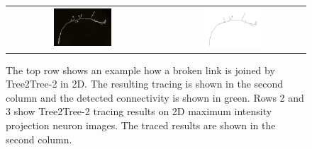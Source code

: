 $$\begin{figure}[tb]
\begin{tabular}{cc}
\includegraphics[width=0.4\textwidth]{images/ch3/n7}	&
\includegraphics[width=0.4\textwidth]{images/ch3/n7_VFC}	
\end{tabular}
\caption[Tree2Tree-2: 2D results]{The top row shows an example how a broken link is joined by Tree2Tree-2 in 2D. The resulting tracing is shown in the second column and the detected connectivity is shown in green. Rows 2 and 3 show Tree2Tree-2 tracing results on 2D maximum intensity projection neuron images. The traced results are shown in the second column.}
\label{fig:T2T2_results2D}
\end{figure}

